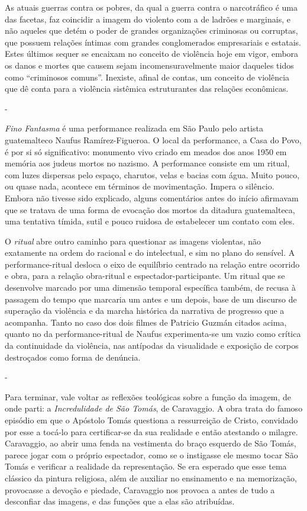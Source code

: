 As atuais guerras contra os pobres, da qual a guerra contra o
narcotráfico é uma das facetas, faz coincidir a imagem do violento com a
de ladrões e marginais, e não aqueles que detém o poder de grandes
organizações criminosas ou corruptas, que possuem relações íntimas com
grandes conglomerados empresariais e estatais. Estes últimos sequer se
encaixam no conceito de violência hoje em vigor, embora os danos e
mortes que causem sejam incomensuravelmente maior daqueles tidos como
``criminosos comuns''. Inexiste, afinal de contas, um conceito de
violência que dê conta para a violência sistêmica estruturantes das
relações econômicas.

-

\emph{Fino Fantasma} é uma performance realizada em São Paulo pelo
artista guatemalteco Naufus Ramírez-Figueroa. O local da performance, a
Casa do Povo, é por si só significativo: monumento vivo criado em meados
dos anos 1950 em memória aos judeus mortos no nazismo. A performance
consiste em um ritual, com luzes dispersas pelo espaço, charutos, velas
e bacias com água. Muito pouco, ou quase nada, acontece em términos de
movimentação. Impera o silêncio. Embora não tivesse sido explicado,
alguns comentários antes do início afirmavam que se tratava de uma forma
de evocação dos mortos da ditadura guatemalteca, uma tentativa tímida,
sutil e pouco ruidosa de estabelecer um contato com eles.

O \emph{ritual} abre outro caminho para questionar as imagens violentas,
não exatamente na ordem do racional e do intelectual, e sim no plano do
sensível. A performance-ritual desloca o eixo de equilíbrio centrado na
relação entre ocorrido e obra, para a relação obra-ritual e
espectador-participante. Um ritual que se desenvolve marcado por uma
dimensão temporal específica também, de recusa à passagem do tempo que
marcaria um antes e um depois, base de um discurso de superação da
violência e da marcha histórica da narrativa de progresso que a
acompanha. Tanto no caso dos dois filmes de Patricio Guzmán citados
acima, quanto no da performance-ritual de Naufus experimenta-se um vazio
como crítica da continuidade da violência, nas antípodas da visualidade
e exposição de corpos destroçados como forma de denúncia.

-

Para terminar, vale voltar as reflexões teológicas sobre a função da
imagem, de onde parti: a \emph{Incredulidade de São Tomás}, de
Caravaggio. A obra trata do famoso episódio em que o Apóstolo Tomás
questiona a ressurreição de Cristo, convidado por esse a tocá-lo para
certificar-se da sua realidade e então atestando o milagre. Caravaggio,
ao abrir uma fenda na vestimenta do braço esquerdo de São Tomás, parece
jogar com o próprio espectador, como se o instigasse ele mesmo tocar São
Tomás e verificar a realidade da representação. Se era esperado que esse
tema clássico da pintura religiosa, além de auxiliar no ensinamento e na
memorização, provocasse a devoção e piedade, Caravaggio nos provoca a
antes de tudo a desconfiar das imagens, e das funções que a elas são
atribuídas.

